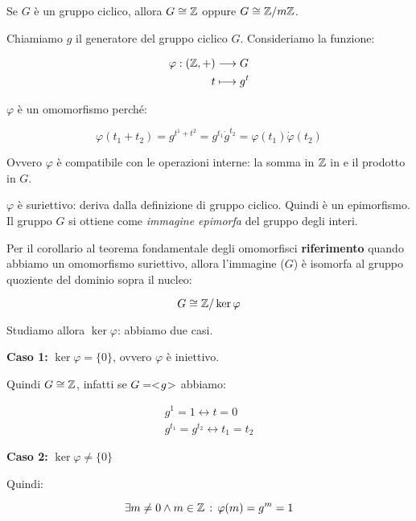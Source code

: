 \begin{teorema}
	\label{thr:Ciclici_isomorfismi_con_z}
	Se $G$ è un gruppo ciclico, allora $G \cong \mathbb{Z}$ oppure $G \cong \mathbb{Z}/m\mathbb{Z}$.
\end{teorema}
\begin{dimostrazione}
	Chiamiamo $g$ il generatore del gruppo ciclico $G$. Consideriamo la funzione:
	
	\begin{align}
		\varphi : (\mathbb{Z}, +) &\longrightarrow G \\
		t &\longmapsto g^t
	\end{align}

	$\varphi$ è un omomorfismo perché:
	
	\begin{equation}
		\varphi(t_1 + t_2) = g^{t^1 + t^2} = g^{t_1} \dot g^{t_2} = \varphi(t_1) \dot \varphi(t_2)
	\end{equation}

	Ovvero $\varphi$ è compatibile con le operazioni interne: la somma in $\mathbb{Z}$ in e il prodotto in $G$.
	
	$\varphi$ è suriettivo: deriva dalla definizione di gruppo ciclico. Quindi è un epimorfismo. Il gruppo $G$ si ottiene come \emph{immagine epimorfa} del gruppo degli interi.
	
	Per il corollario al teorema fondamentale degli omomorfisci \textbf{riferimento} quando abbiamo un omomorfismo suriettivo, allora l'immagine ($G$) è isomorfa al gruppo quoziente del dominio sopra il nucleo:
	
	\begin{equation}
		G \cong \mathbb{Z}/\ker \varphi
	\end{equation}

	Studiamo allora $\ker \varphi$: abbiamo due casi.
	
	\textbf{Caso 1: } $\ker \varphi = \{0\}$, ovvero $\varphi$ è iniettivo.
	
	Quindi $G \cong \mathbb{Z}$, infatti se $G = < \negmedspace g \negmedspace >$ abbiamo:
	
	\begin{gather}
		g^1 = 1 \longleftrightarrow t = 0 \\
		g^{t_1} = g^{t_2} \longleftrightarrow t_1 = t_2
	\end{gather}

	\textbf{Caso 2: } $\ker \varphi \ne \{0\}$
	
	Quindi:
	
	\begin{equation}
		\exists m \ne 0 \land m \in \mathbb{Z} \,:\, \varphi(m) = g^m = 1
	\end{equation}


\end{dimostrazione}
